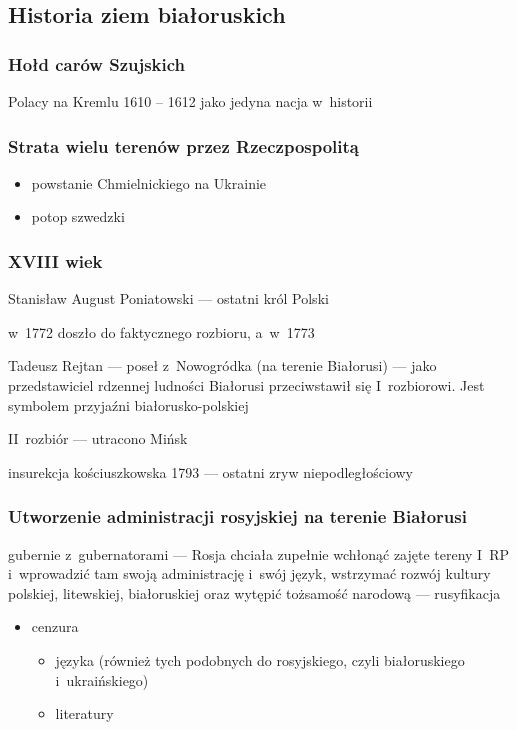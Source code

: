 \subsection*{Historia ziem białoruskich}
\subsubsection*{Hołd carów Szujskich}
\begin{description}
    \item Polacy na Kremlu 1610 -- 1612 jako jedyna nacja w~historii
\end{description}
\subsubsection*{Strata wielu terenów przez Rzeczpospolitą}
\begin{itemize}
    \item powstanie Chmielnickiego na Ukrainie
    \item potop szwedzki
\end{itemize}
\subsubsection*{XVIII wiek}
\begin{description}
    \item Stanisław August Poniatowski --- ostatni król Polski
    \item w~1772 doszło do faktycznego rozbioru, a~w~1773 
    \item Tadeusz Rejtan --- poseł z~Nowogródka (na terenie Białorusi) --- jako przedstawiciel rdzennej ludności Białorusi przeciwstawił się I~rozbiorowi. Jest symbolem przyjaźni białorusko-polskiej
    \item II~rozbiór --- utracono Mińsk
    \item insurekcja kościuszkowska 1793 --- ostatni zryw niepodległościowy
\end{description}
\subsubsection*{Utworzenie administracji rosyjskiej na terenie Białorusi}
\begin{description}
    \item gubernie z~gubernatorami --- Rosja chciała zupełnie wchłonąć zajęte tereny I~RP i~wprowadzić tam swoją administrację i~swój język, wstrzymać rozwój kultury polskiej, litewskiej, białoruskiej oraz wytępić tożsamość narodową --- rusyfikacja
        \begin{itemize}
            \item cenzura
                \begin{itemize}
                    \item języka (również tych podobnych do rosyjskiego, czyli białoruskiego i~ukraińskiego)
                    \item literatury
                \end{itemize}
        \end{itemize}
\end{description}
